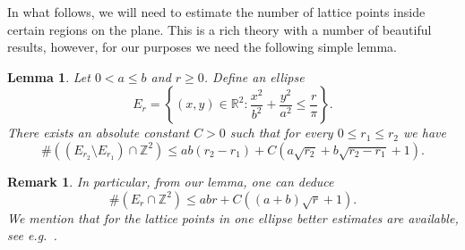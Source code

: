 \documentclass[11pt]{amsart}
\numberwithin{equation}{section}
\newtheorem{lemma}[theorem]{Lemma}
\newtheorem{remark}[theorem]{Remark}
\newcommand{\R}{{\mathbb R}}
\newcommand{\Z}{{\mathbb Z}}
\begin{document}
In what follows, we will need to estimate the number of lattice points inside certain regions on the plane. This is a rich theory with a number of beautiful results, however, for our purposes we need the following simple lemma.

\begin{lemma}\label{lem:ellipse_lattice_count}
Let $0< a \leq b$ and $r\geq0$. Define an ellipse
    \begin{equation}
        E_r = \left \{(x,y)\in \R^2 :\frac{x^2}{b^2}+\frac{y^2}{a^2}\leq \frac{r}{\pi} \right \}.
    \end{equation}
There exists an absolute constant $C>0$ such that for every $0 \leq r_1 \leq r_2$ we have
\begin{equation}\label{eq:ellipse_difference}
     \#\left(( E_{r_2} \setminus E_{r_1})\cap \Z^2 \right) \leq ab(r_2-r_1) + C(a\sqrt{r_2} + b \sqrt{r_2-r_1} + 1).
\end{equation}
\end{lemma}

\begin{remark}
    In particular, from our lemma, one can deduce
\begin{equation}\label{eq:ellipse}
     \#\left( E_{r}\cap \Z^2 \right) \leq abr + C((a+b)\sqrt{r} + 1).
\end{equation}
We mention that for the lattice points in one ellipse better estimates are available, see e.g.~\cite{Nosarzewska1948}.
\end{remark}
\end{document}
